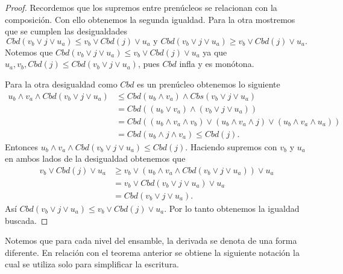 \documentclass[12pt,letterpaper,titlepage]{article}
\theoremstyle{definition}
\newcommand\<{\langle}
\renewcommand\>{\rangle}
\begin{document}
\begin{proof}
    Recordemos que los supremos entre prenúcleos se relacionan con la composición. Con ello obtenemos la segunda igualdad. Para la otra mostremos que se cumplen las desigualdades 
    $$Cbd(v_b\vee j\vee u_a)\leq v_b\vee Cbd(j)\vee u_a\mbox{  y  }Cbd(v_b\vee j\vee u_a)\geq v_b\vee Cbd(j)\vee u_a.$$
    Notemos que $Cbd(v_b\vee j\vee u_a)\leq v_b\vee Cbd(j)\vee u_a$ ya que $u_a,v_b,Cbd(j)\leq Cbd(v_b\vee j\vee u_a)$, pues $Cbd$ infla y es monótona.
    
    \noindent
    Para la otra desigualdad como $Cbd$ es un prenúcleo obtenemos lo siguiente
    \begin{equation*}
        \begin{split}
            u_b\wedge v_a\wedge Cbd(v_b\vee j\vee u_a)& \leq Cbd(u_b \wedge v_a)\wedge Cbs(v_b\vee j\vee u_a)\\
            & =Cbd((u_b\vee v_a)\wedge (v_b\vee j\vee u_a))\\
            & =Cbd((u_b\wedge v_a\wedge v_b)\vee (u_b\wedge v_a\wedge j)\vee (u_b\wedge v_a\wedge u_a))\\
            & =Cbd(u_b\wedge j\wedge v_a)\leq Cbd(j).
        \end{split}
    \end{equation*}
    Entonces $u_b\wedge v_a\wedge Cbd(v_b\vee j\vee u_a)\leq Cbd(j)$. Haciendo supremos con $v_b$ y $u_a$ en ambos lados de la desigualdad obtenemos que
    \begin{equation*}
        \begin{split}
            v_b\vee Cbd(j)\vee u_a & \geq v_b\vee (u_b\wedge v_a\wedge Cbd(v_b\vee j\vee u_a))\vee u_a\\
            & =v_b\vee Cbd(v_b\vee j\vee u_a)\vee u_a\\
            & =Cbd(v_b\vee j\vee u_a).
        \end{split}
    \end{equation*}
    Así $Cbd(v_b\vee j\vee u_a)\leq v_b\vee Cbd(j)\vee u_a$. Por lo tanto obtenemos la igualdad buscada.
\end{proof}

Notemos que para cada nivel del ensamble, la derivada se denota de una forma diferente. En relación con el teorema anterior se obtiene la siguiente notación la cual se utiliza solo para simplificar la escritura. 
\end{document}
